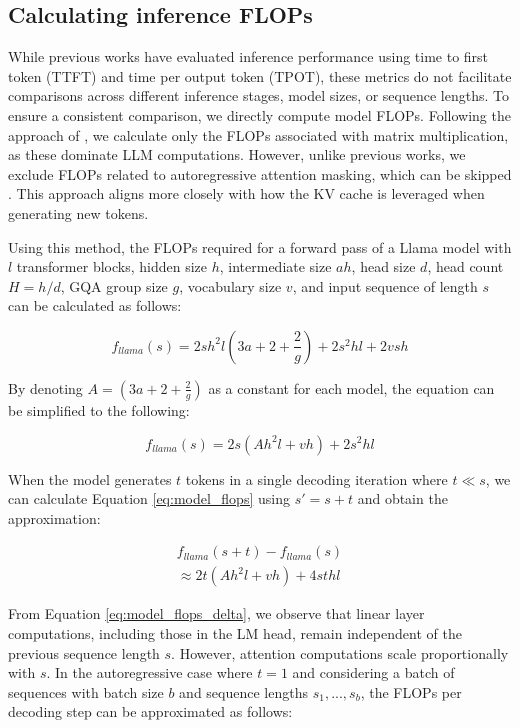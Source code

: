 \subsection{Calculating inference FLOPs}

While previous works \citep{splitwise} have evaluated inference performance using time to first token (TTFT) and time per output token (TPOT), these metrics do not facilitate comparisons across different inference stages, model sizes, or sequence lengths. To ensure a consistent comparison, we directly compute model FLOPs.
Following the approach of \citet{pytorch2, megatron_lm}, we calculate only the FLOPs associated with matrix multiplication, as these dominate LLM computations. However, unlike previous works, we exclude FLOPs related to autoregressive attention masking, which can be skipped \citep{dao2024flashattention}. This approach aligns more closely with how the KV cache is leveraged when generating new tokens.

Using this method, the FLOPs required for a forward pass of a Llama model with $l$ transformer blocks, hidden size $h$, intermediate size $ah$, head size $d$,  head count $H=h/d$, GQA group size $g$, vocabulary size $v$, and input sequence of length $s$ can be calculated as follows:

\begin{equation}
  f_{llama}(s)=2sh^2l(3a+2+\frac{2}{g})+2s^2hl+2vsh
\label{eq:model_flops}
\end{equation}

By denoting $A=(3a+2+\frac{2}{g})$ as a constant for each model, the equation can be simplified to the following:

\begin{equation}
  f_{llama}(s)=2s(Ah^2l+vh)+2s^2hl
\label{eq:model_flops_simple}
\end{equation}

When the model generates $t$ tokens in a single decoding iteration where $t \ll s$, we can calculate Equation \ref{eq:model_flops} using $s'=s+t$ and obtain the approximation:

\begin{equation}
\begin{aligned}
  f_{llama}(s+t)-f_{llama}(s) \\
  \approx 2t(Ah^2l+vh)+4sthl
\label{eq:model_flops_delta}
\end{aligned}
\end{equation}

From Equation \ref{eq:model_flops_delta}, we observe that linear layer computations, including those in the LM head, remain independent of the previous sequence length $s$. However, attention computations scale proportionally with $s$.
In the autoregressive case where $t=1$ and considering a batch of sequences with batch size $b$ and sequence lengths $s_1, ..., s_b$, the FLOPs per decoding step can be approximated as follows:

